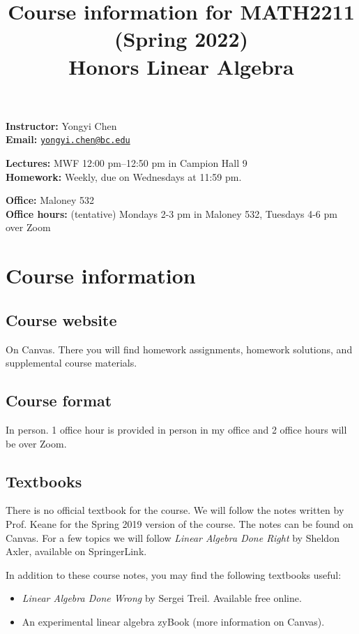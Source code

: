 \documentclass[11pt,oneside]{amsart}
\title{Course information for MATH2211 (Spring 2022)\\
    Honors Linear Algebra}
\begin{document}
\maketitle

\textbf{Instructor:} Yongyi Chen\\
\textbf{Email:} \href{mailto:yongyi.chen@bc.edu}{\texttt{yongyi.chen@bc.edu}}

\textbf{Lectures:} MWF 12:00 pm--12:50 pm in Campion Hall 9\\
\textbf{Homework:} Weekly, due on Wednesdays at 11:59 pm.

\textbf{Office:} Maloney 532\\
\textbf{Office hours:} (tentative) Mondays 2-3 pm in Maloney 532, Tuesdays 4-6 pm over Zoom

\section{Course information}
\subsection*{Course website}
On Canvas. There you will find homework assignments, homework solutions, and supplemental course materials.

\subsection*{Course format}
In person. 1 office hour is provided in person in my office and 2 office hours will be over Zoom.

\subsection*{Textbooks}
There is no official textbook for the course. We will follow the notes written by Prof. Keane for the Spring 2019 version of the course. The notes can be found on Canvas. For a few topics we will follow \emph{Linear Algebra Done Right} by Sheldon Axler, available on SpringerLink.

In addition to these course notes, you may find the following textbooks useful:
\begin{itemize}
    \item \emph{Linear Algebra Done Wrong} by Sergei Treil. Available free online.
    \item An experimental linear algebra zyBook (more information on Canvas).
\end{itemize}
\end{document}
